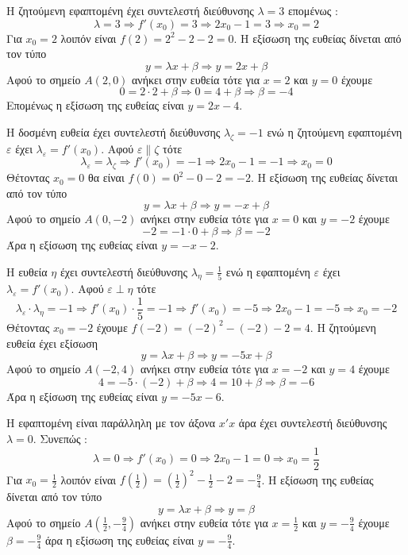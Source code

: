 \documentclass[a4paper,11pt,twoside]{article}
\begin{document}
\begin{alist}
\item Η ζητούμενη εφαπτομένη έχει συντελεστή διεύθυνσης $\lambda=3$ επομένως :
\[ \lambda=3\Rightarrow f'(x_0)=3\Rightarrow 2x_0-1=3\Rightarrow x_0=2 \]
Για $x_0=2$ λοιπόν είναι $f(2)=2^2-2-2=0$. Η εξίσωση της ευθείας δίνεται από τον τύπο
\[y=\lambda x+\beta\Rightarrow y=2x+\beta\]
Αφού το σημείο $A(2,0)$ ανήκει στην ευθεία τότε για $x=2$ και $y=0$ έχουμε
\[0=2\cdot 2+\beta\Rightarrow 0=4+\beta\Rightarrow \beta=-4\]
Επομένως η εξίσωση της ευθείας είναι $y=2x-4$.
\item Η δοσμένη ευθεία έχει συντελεστή διεύθυνσης $\lambda_{\zeta}=-1$ ενώ η ζητούμενη εφαπτομένη $\varepsilon $ έχει $\lambda_{\varepsilon}=f'(x_0)$. Αφού $\varepsilon\parallel \zeta$ τότε
\[ \lambda_{\varepsilon}=\lambda_{\zeta}\Rightarrow f'(x_0)=-1\Rightarrow 2x_0-1=-1\Rightarrow x_0=0 \]
Θέτοντας $x_0=0$ θα είναι $f(0)=0^2-0-2=-2$. Η εξίσωση της ευθείας δίνεται από τον τύπο
\[y=\lambda x+\beta\Rightarrow y=-x+\beta\]
Αφού το σημείο $A(0,-2)$ ανήκει στην ευθεία τότε για $x=0$ και $y=-2$ έχουμε
\[-2=-1\cdot 0+\beta\Rightarrow \beta=-2\]
Άρα η εξίσωση της ευθείας είναι $y=-x-2$.
\item Η ευθεία $\eta$ έχει συντελεστή διεύθυνσης $\lambda_{\eta}=\frac{1}{5}$ ενώ η εφαπτομένη $\varepsilon $ έχει $\lambda_{\varepsilon}=f'(x_0)$. Αφού $\varepsilon\perp \eta$ τότε
\[ \lambda_{\varepsilon}\cdot\lambda_{\eta}=-1\Rightarrow f'(x_0)\cdot\frac{1}{5}=-1\Rightarrow f'(x_0)=-5\Rightarrow 2x_0-1=-5\Rightarrow x_0=-2 \]
Θέτοντας $x_0=-2$ έχουμε $f(-2)=(-2)^2-(-2)-2=4$. Η ζητούμενη ευθεία έχει εξίσωση
\[y=\lambda x+\beta\Rightarrow y=-5x+\beta\]
Αφού το σημείο $A(-2,4)$ ανήκει στην ευθεία τότε για $x=-2$ και $y=4$ έχουμε
\[4=-5\cdot(-2)+\beta\Rightarrow 4=10+\beta\Rightarrow \beta=-6\]
Άρα η εξίσωση της ευθείας είναι $y=-5x-6$.
\item Η εφαπτομένη είναι παράλληλη με τον άξονα $x'x$ άρα έχει συντελεστή διεύθυνσης $\lambda=0$. Συνεπώς :
\[ \lambda=0\Rightarrow f'(x_0)=0\Rightarrow 2x_0-1=0\Rightarrow x_0=\frac{1}{2} \]
Για $x_0=\frac{1}{2}$ λοιπόν είναι $f\left(\frac{1}{2}\right)=\left(\frac{1}{2}\right)^2-\frac{1}{2}-2=-\frac{9}{4}$. Η εξίσωση της ευθείας δίνεται από τον τύπο
\[y=\lambda x+\beta\Rightarrow y=\beta\]
Αφού το σημείο $A\left(\frac{1}{2},-\frac{9}{4}\right)$ ανήκει στην ευθεία τότε για $x=\frac{1}{2}$ και $y=-\frac{9}{4}$ έχουμε $\beta=-\frac{9}{4}$
άρα η εξίσωση της ευθείας είναι $y=-\frac{9}{4}$.
\end{alist}
\end{document}
